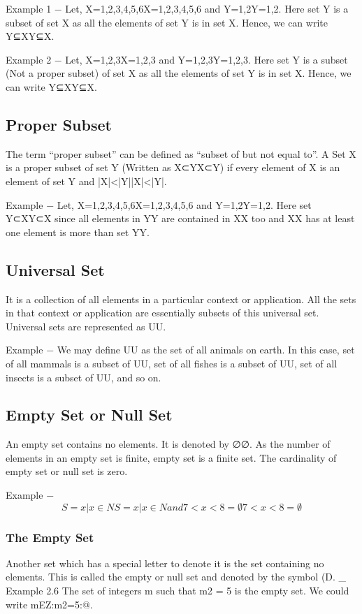 Example 1 − Let, X={1,2,3,4,5,6}X={1,2,3,4,5,6} and Y={1,2}Y={1,2}. Here set Y is a subset of set X as all the elements of set Y is in set X. Hence, we can write Y⊆XY⊆X.

Example 2 − Let, X={1,2,3}X={1,2,3} and Y={1,2,3}Y={1,2,3}. Here set Y is a subset (Not a proper subset) of set X as all the elements of set Y is in set X. Hence, we can write Y⊆XY⊆X.

\subsection{Proper Subset}
The term “proper subset” can be defined as “subset of but not equal to”. A Set X is a proper subset of set Y (Written as X⊂YX⊂Y) if every element of X is an element of set Y and |X|<|Y||X|<|Y|.

Example − Let, X={1,2,3,4,5,6}X={1,2,3,4,5,6} and Y={1,2}Y={1,2}. Here set Y⊂XY⊂X since all elements in YY are contained in XX too and XX has at least one element is more than set YY.

\subsection{Universal Set}
It is a collection of all elements in a particular context or application. All the sets in that context or application are essentially subsets of this universal set. Universal sets are represented as UU.

Example − We may define UU as the set of all animals on earth. In this case, set of all mammals is a subset of UU, set of all fishes is a subset of UU, set of all insects is a subset of UU, and so on.

\subsection{Empty Set or Null Set}
An empty set contains no elements. It is denoted by ∅∅. As the number of elements in an empty set is finite, empty set is a finite set. The cardinality of empty set or null set is zero.

Example − \[S={x|x∈NS={x|x∈N and 7<x<8}=∅7<x<8}=∅\]

\frametitle{The Empty Set}

Another set which has a special letter to denote it is the set containing no elements. This is called
the empty or null set and denoted by the symbol (D. _
Example 2.6 The set of integers m such that m2 = 5 is the empty set. We could write
{mEZ:m2=5}:@.
\smallskip 




